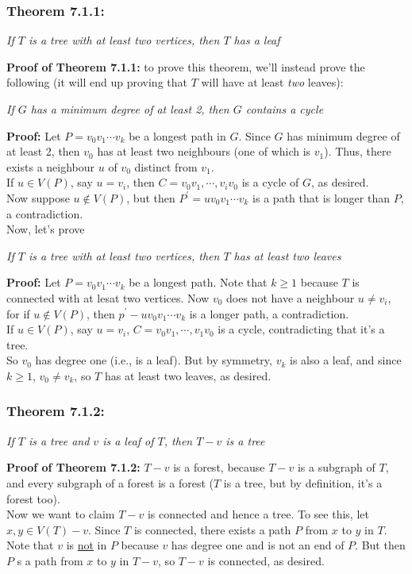 \documentclass{report}
\begin{document}
\subsubsection{Theorem 7.1.1:}
\begin{center}
\textit{If $T$ is a tree with at least two vertices, then $T$ has a leaf}
\end{center}
\textbf{Proof of Theorem 7.1.1:} to prove this theorem, we'll instead prove the following (it will end up proving that $T$ will have at least \textit{two} leaves):
\begin{center}
\textit{If $G$ has a minimum degree of at least 2, then $G$ contains a cycle}
\end{center}
\textbf{Proof:} Let $P = v_0v_1 \cdots v_k$ be a longest path in $G$. Since $G$ has minimum degree of at least 2, then $v_0$ has at least two neighbours (one of which is $v_1$). Thus, there exists a neighbour $u$ of $v_0$ distinct from $v_1$.\\
If $u \in V(P)$, say $u = v_i$, then $C = v_0v_1, \cdots, v_iv_0$ is a cycle of $G$, as desired.\\
Now suppose  $u \notin V(P)$, but then $P^\prime = uv_0v_1\cdots v_k$ is a path that is longer than $P$, a contradiction.\\
Now, let's prove
\begin{center}
\textit{If $T$ is a tree with at least two vertices, then $T$ has at least two leaves}
\end{center}
\textbf{Proof:} Let $P = v_0v_1 \cdots v_k$ be a longest path. Note that $k \geq 1$ because $T$ is connected with at lesat two vertices. Now $v_0$ does not have a neighbour $u \neq v_i$, for if $u \notin V(P)$, then $p^\prime - uv_0v_1 \cdots v_k$ is a longer path, a contradiction.\\
If $u \in V(P)$, say $u = v_i$, $C = v_0v_1, \cdots, v_1v_0$ is a cycle, contradicting that it's a tree.\\
So $v_0$ has degree one (i.e., is a leaf). But by symmetry, $v_k$ is also a leaf, and since $k \geq 1$, $v_0 \neq v_k$, so $T$ has at least two leaves, as desired.
\subsubsection{Theorem 7.1.2:}
\begin{center}
\textit{If $T$ is a tree and $v$ is a leaf of $T$, then $T-v$ is a tree}
\end{center}
\textbf{Proof of Theorem 7.1.2:} $T-v$ is a forest, because $T-v$ is a subgraph of $T$, and every subgraph of a forest is a forest ($T$ is a tree, but by definition, it's a forest too).\\
Now we want to claim $T-v$ is connected and hence a tree. To see this, let $x, y \in V(T)-v$. Since $T$ is connected, there exists a path $P$ from $x$ to $y$ in $T$. Note that $v$  is \underline{not} in $P$ because $v$ has degree one and is not an end of $P$. But then $P$ s a path from $x$ to $y$ in $T-v$, so $T-v$ is connected, as desired.
\end{document}
